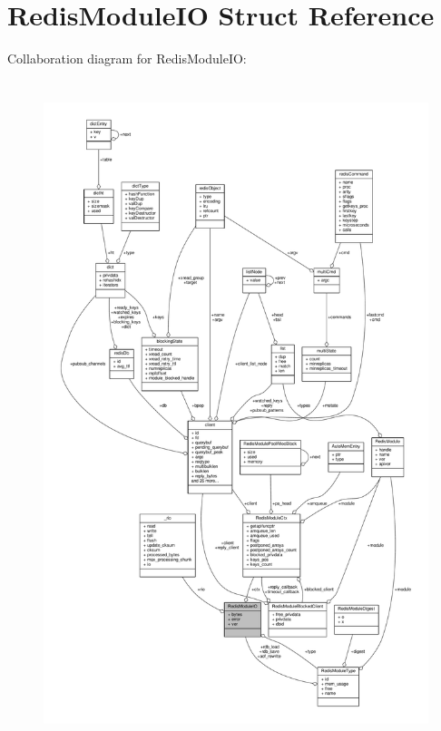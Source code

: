 \hypertarget{structRedisModuleIO}{}\section{Redis\+Module\+IO Struct Reference}
\label{structRedisModuleIO}


Collaboration diagram for Redis\+Module\+IO\+:\nopagebreak
\begin{figure}[H]
\begin{center}
\leavevmode
\includegraphics[height=550pt]{structRedisModuleIO__coll__graph}
\end{center}
\end{figure}
